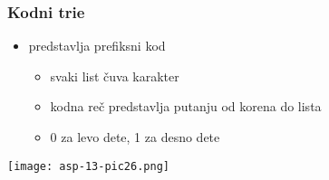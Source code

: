 \documentclass[compress,aspectratio=169]{beamer}
\begin{document}
\begin{frame}[fragile]
  \frametitle{Kodni trie}
  \begin{itemize}
    \item {} predstavlja prefiksni kod
    \begin{itemize}
      \item svaki list čuva karakter
      \item kodna reč predstavlja putanju od korena do lista
      \item 0 za levo dete, 1 za desno dete
    \end{itemize}
  \end{itemize}
  \begin{center}
    \texttt{[image: asp-13-pic26.png]}
  \end{center}
\end{frame}
\end{document}
